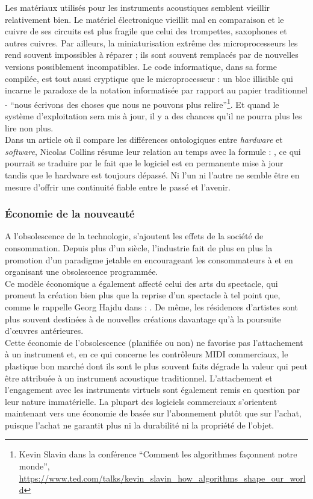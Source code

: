 \noindent Les matériaux utilisés pour les instruments acoustiques semblent vieillir relativement bien. Le matériel électronique vieillit mal en comparaison et le cuivre de ses circuits est plus fragile que celui des trompettes, saxophones et autres cuivres. Par ailleurs, la miniaturisation extrême des microprocesseurs les rend souvent impossibles à réparer ; ils sont souvent remplacés par de nouvelles versions possiblement incompatibles. Le code informatique, dans sa forme compilée, est tout aussi cryptique que le microprocesseur : un bloc illisible qui incarne le paradoxe de la notation informatisée par rapport au papier traditionnel - ``nous écrivons des choses que nous ne pouvons plus relire''\footnote{Kevin Slavin dans la conférence ``Comment les algorithmes façonnent notre monde'', \url{https://www.ted.com/talks/kevin_slavin_how_algorithms_shape_our_world}}. Et quand le système d'exploitation sera mis à jour, il y a des chances qu'il ne pourra plus les lire non plus.\\
\indent Dans un article où il compare les différences ontologiques entre \textit{hardware} et \textit{software}, Nicolas Collins \cite{collins_semiconducting_2013} résume leur relation au temps avec la formule : , ce qui pourrait se traduire par le fait que le logiciel est en permanente mise à jour tandis que le hardware est toujours dépassé. Ni l'un ni l'autre ne semble être en mesure d'offrir une continuité fiable entre le passé et l'avenir.

	
\subsubsection{Économie de la nouveauté}

\noindent A l'obsolescence de la technologie, s'ajoutent les effets de la société de consommation. Depuis plus d'un siècle, l'industrie fait de plus en plus la promotion d'un paradigme jetable en encourageant les consommateurs à  \cite{slade_made_2006} et en organisant une obsolescence programmée.\\
\indent Ce modèle économique a également affecté celui des arts du spectacle, qui promeut la création bien plus que la reprise d'un spectacle à tel point que, comme le rappelle Georg Hajdu dans \cite{hajdu_disposable_2016} : . De même, les résidences d'artistes sont plus souvent destinées à de nouvelles créations davantage qu'à la poursuite d'œuvres antérieures.\\
\indent Cette économie de l'obsolescence (planifiée ou non) ne favorise pas l'attachement à un instrument et, en ce qui concerne les contrôleurs MIDI commerciaux, le plastique bon marché dont ils sont le plus souvent faits dégrade la valeur qui peut être attribuée à un instrument acoustique traditionnel. L'attachement et l'engagement avec les instruments virtuels sont également remis en question par leur nature immatérielle. La plupart des logiciels commerciaux s'orientent maintenant vers une économie de basée sur l'abonnement plutôt que sur l'achat, puisque l'achat ne garantit plus ni la durabilité ni la propriété de l'objet.

